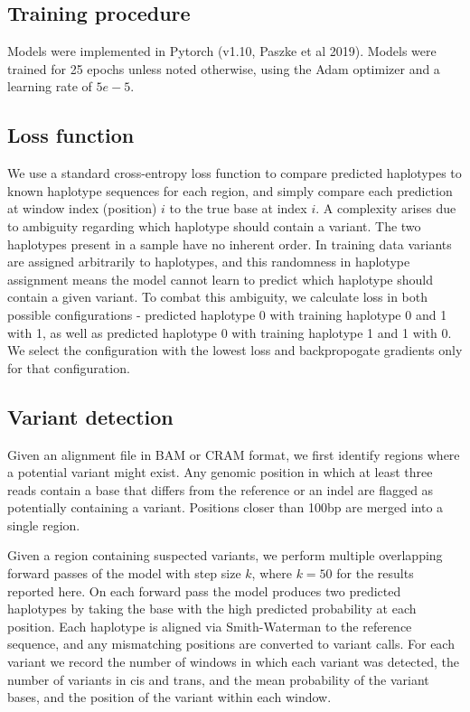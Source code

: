\documentclass[]{article}
\begin{document}
\subsection{Training procedure}


Models were implemented in Pytorch (v1.10, Paszke et al 2019). Models were trained for 25 epochs unless noted otherwise, using the Adam optimizer and a learning rate of $5e-5$. 

\subsection{Loss function}

We use a standard cross-entropy loss function to compare predicted haplotypes to known haplotype sequences for each region, and simply compare each prediction at window index (position) $i$ to the true base at index $i$. A complexity arises due to ambiguity regarding which haplotype should contain a variant. The two haplotypes present in a sample have no inherent order. In training data variants are assigned arbitrarily to haplotypes, and this randomness in haplotype assignment means the model cannot learn to predict which haplotype should contain a given variant. To combat this ambiguity, we calculate loss in both possible configurations - predicted haplotype 0 with training haplotype 0 and 1 with 1, as well as predicted haplotype 0 with training haplotype 1 and 1 with 0. We select the configuration with the lowest loss and backpropogate gradients only for that configuration. 



\subsection{Variant detection}

Given an alignment file in BAM or CRAM format, we first identify regions where a potential variant might exist. Any genomic position in which at least three reads contain a base that differs from the reference or an indel are flagged as potentially containing a variant. Positions closer than 100bp are merged into a single region. 


Given a region containing suspected variants, we perform multiple overlapping forward passes of the model with step size $k$, where $k=50$ for the results reported here. On each forward pass the model produces two predicted haplotypes by taking the base with the high predicted probability at each position. Each haplotype is aligned via Smith-Waterman to the reference sequence, and any mismatching positions are converted to variant calls. For each variant we record the number of windows in which each variant was detected, the number of variants in cis and trans, and the mean probability of the variant bases, and the position of the variant within each window.   
\end{document}
